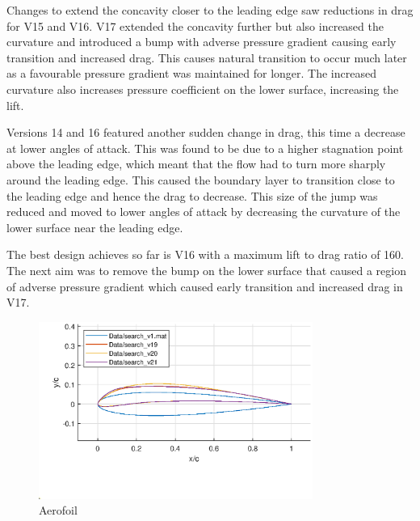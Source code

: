 \documentclass{article}
\begin{document}
Changes to extend the concavity closer to the leading edge saw reductions in drag for V15 and V16.
V17 extended the concavity further but also increased the curvature and introduced a bump with adverse pressure gradient causing early transition and increased drag.
This causes natural transition to occur much later as a favourable pressure gradient was maintained for longer.
The increased curvature also increases pressure coefficient on the lower surface, increasing the lift.

Versions 14 and 16 featured another sudden change in drag, this time a decrease at lower angles of attack.
This was found to be due to a higher stagnation point above the leading edge, which meant that the flow had to turn more sharply around the leading edge.
This caused the boundary layer to transition close to the leading edge and hence the drag to decrease.
This size of the jump was reduced and moved to lower angles of attack by decreasing the curvature of the lower surface near the leading edge.

The best design achieves so far is V16 with a maximum lift to drag ratio of 160.
The next aim was to remove the bump on the lower surface that caused a region of adverse pressure gradient
which caused early transition and increased drag in V17.

\begin{figure}[H]
    \centering
    \includegraphics[width=0.8\textwidth]{figures/hiRe_geometry_21.eps}
    \caption{Aerofoil}
    \label{fig:v21_geometry}
\end{figure}
\end{document}
